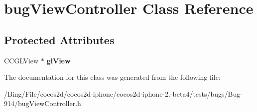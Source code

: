 \hypertarget{interfacebug_view_controller}{\section{bug\-View\-Controller Class Reference}
\label{interfacebug_view_controller}
}
\subsection*{Protected Attributes}
\begin{DoxyCompactItemize}
\item 
\hypertarget{interfacebug_view_controller_afc917ae0187fe963a31d33bdca1e04fd}{C\-C\-G\-L\-View $\ast$ {\bfseries gl\-View}}\label{interfacebug_view_controller_afc917ae0187fe963a31d33bdca1e04fd}

\end{DoxyCompactItemize}


The documentation for this class was generated from the following file\-:\begin{DoxyCompactItemize}
\item 
/\-Bing/\-File/cocos2d/cocos2d-\/iphone/cocos2d-\/iphone-\/2.-\/beta4/tests/bugs/\-Bug-\/914/bug\-View\-Controller.\-h\end{DoxyCompactItemize}
